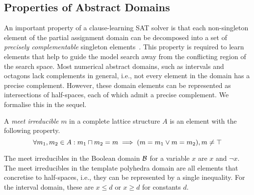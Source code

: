 \subsection{Properties of Abstract Domains}
%
An important property of a clause-learning SAT solver is that each
non-singleton element of the partial assignment domain can be 
decomposed into a set of \textit{precisely complementable} singleton
elements~\cite{dhk2013-popl}.  This property 
is required to learn elements that help to guide the model search away from the
conflicting region of the search space.  
%
Most numerical abstract domains, such as intervals and octagons lack
complements in general, i.e., not every element in the domain has a
precise complement.  However, these domain elements can be represented
as intersections of half-spaces, each of which admit a precise complement.
%
We formalise this in the sequel.
%
\begin{definition} 
A \emph{meet irreducible} $m$ in a complete lattice 
structure $A$ is an element with the following property.
\begin{equation}
\forall m_1, m_2 \in A: m_1 \sqcap m_2 = m \implies (m = m_1 \lor m = m_2), m \neq \top  
\end{equation}
\end{definition}
%
The meet irreducibles in the Boolean domain $\mathcal{B}$ 
for a variable $x$ are $x$ and $\neg x$. The meet 
irreducibles in the template polyhedra domain are all elements 
that concretise to half-spaces, i.e., they can be represented 
by a single inequality. For the interval domain, these are 
$x \leq d$ or $x \geq d$ for constants $d$. 


